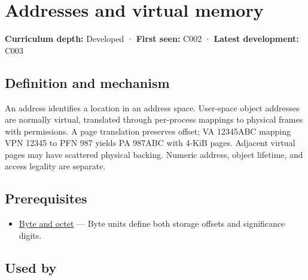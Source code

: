 \hypertarget{appendix-18ee4f913c3c}{}\label{referencestart:appendix-18ee4f913c3c}
\section{Addresses and virtual memory}\label{appendix-18ee4f913c3c-addresses-and-virtual-memory}

\hypertarget{appendix-18ee4f913c3c-addresses-and-virtual-memory}{}

\textbf{Curriculum depth:} Developed · \textbf{First seen:} C002 · \textbf{Latest development:} C003

\begin{allmightroledefinition}

\subsection{Definition and mechanism}\label{appendix-18ee4f913c3c-definition-and-mechanism}

\hypertarget{appendix-18ee4f913c3c-definition-and-mechanism}{}

An address identifies a location in an address space. User-space object addresses are normally virtual, translated through per-process mappings to physical frames with permissions. A page translation preserves offset; VA 12345ABC mapping VPN 12345 to PFN 987 yields PA 987ABC with 4-KiB pages. Adjacent virtual pages may have scattered physical backing. Numeric address, object lifetime, and access legality are separate.

\end{allmightroledefinition}

\subsection{Prerequisites}\label{appendix-18ee4f913c3c-prerequisites}

\hypertarget{appendix-18ee4f913c3c-prerequisites}{}

\begin{itemize}
\tightlist
\item
  \hyperref[appendix-5bee2df85484]{Byte and octet} --- Byte units define both storage offsets and significance digits.
\end{itemize}

\subsection{Used by}\label{appendix-18ee4f913c3c-used-by}

